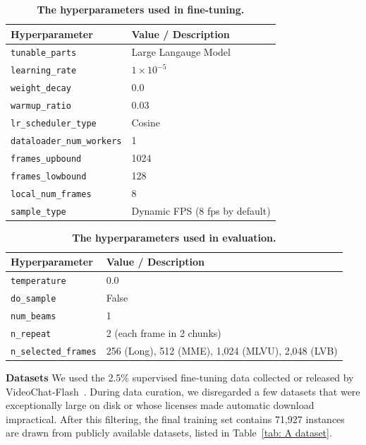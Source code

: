 \begin{table}[h!]
\renewcommand{\thetable}{A}
\caption{\textbf{The hyperparameters used in fine-tuning.}}
\vspace{3pt}
\label{tab:hyperparams}
\centering
\begin{tabular}{ll}
\toprule
\textbf{Hyperparameter} & \textbf{Value / Description} \\
\midrule
\texttt{tunable\_parts} & Large Langauge Model \\
\texttt{learning\_rate} & $1 \times 10^{-5}$ \\
\texttt{weight\_decay} & $0.0$ \\
\texttt{warmup\_ratio} & 0.03 \\
\texttt{lr\_scheduler\_type} & Cosine \\
\texttt{dataloader\_num\_workers} & 1 \\
\texttt{frames\_upbound} & 1024 \\
\texttt{frames\_lowbound} & 128 \\
\texttt{local\_num\_frames} & 8 \\
\texttt{sample\_type} & Dynamic FPS (8 fps by default) \\
\bottomrule
\end{tabular}
\vspace{3pt}
\end{table}


\begin{table}[h!]
\renewcommand{\thetable}{B}
\caption{\textbf{The hyperparameters used in evaluation.}}
\vspace{3pt}
\label{tab:evalhyperparams}
\centering
\begin{tabular}{ll}
\toprule
\textbf{Hyperparameter} & \textbf{Value / Description} \\
\midrule
\texttt{temperature} & 0.0 \\
\texttt{do\_sample} & False \\
\texttt{num\_beams} & 1 \\
\texttt{n\_repeat} & 2 (each frame in 2 chunks) \\
\texttt{n\_selected\_frames} & 256 (Long), 512 (MME), 1,024 (MLVU), 2,048 (LVB) \\
\bottomrule
\end{tabular}
\vspace{3pt}
\end{table}

\noindent\textbf{Datasets}\;\; We used the 2.5\% supervised fine‑tuning data collected or released by VideoChat‑Flash~\cite{li2024videochat}.  
During data curation, we disregarded a few datasets that were exceptionally large on disk or whose licenses made automatic download impractical. After this filtering, the final training set contains 71,927
instances are drawn from publicly available datasets, listed in Table~\ref{tab: A dataset}.


